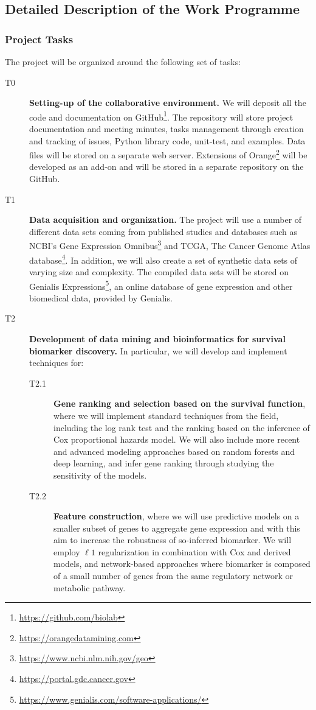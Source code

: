 \documentclass[11pt,a4paper]{article}
\newcommand{\myurl}[1]{\footnote{\url{#1}}}
\renewcommand{\bold}{\textbf}
\begin{document}
\subsection{Detailed Description of the Work Programme}

\subsubsection{Project Tasks}

The project will be organized around the following set of tasks:
\begin{description}
	\item[T0] \bold{Setting-up of the collaborative environment.} We will deposit all the code and documentation on GitHub\myurl{https://github.com/biolab}. The repository will store project documentation and meeting minutes, tasks management through creation and tracking of issues, Python library code, unit-test, and examples. Data files will be stored on a separate web server. Extensions of Orange\myurl{https://orangedatamining.com} will be developed as an add-on and will be stored in a separate repository on the GitHub.
	\item[T1] \bold{Data acquisition and organization.} The project will use a number of different data sets coming from published studies and databases such as NCBI's Gene Expression Omnibus\myurl{https://www.ncbi.nlm.nih.gov/geo} and TCGA, The Cancer Genome Atlas database\myurl{https://portal.gdc.cancer.gov}. In addition, we will also create a set of synthetic data sets of varying size and complexity. The compiled data sets will be stored on Genialis Expressions\myurl{https://www.genialis.com/software-applications/}, an online database of gene expression and other biomedical data, provided by Genialis.
	\item[T2] \bold{Development of data mining and bioinformatics for survival biomarker discovery.} In particular, we will develop and implement techniques for:
	\begin{description}
		\item[T2.1] \bold{Gene ranking and selection based on the survival function}, where we will implement standard techniques from the field, including the log rank test and the ranking based on the inference of Cox proportional hazards model. We will also include more recent and advanced modeling approaches based on random forests and deep learning, and infer gene ranking through studying the sensitivity of the models.
		\item[T2.2] \bold{Feature construction}, where we will use predictive models on a smaller subset of genes to aggregate gene expression and with this aim to increase the robustness of so-inferred biomarker. We will employ $\ell 1$ regularization in combination with Cox and derived models, and network-based approaches where biomarker is composed of a small number of genes from the same regulatory network or metabolic pathway.

\end{description}
\end{description}
\end{document}
